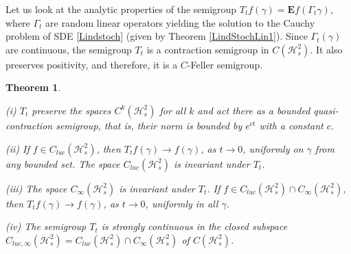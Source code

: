 \documentclass[10pt,a4paper]{amsart}
\def\HC{\mathcal{H}}
\def\E{\mathbf{E}}
\def\ga{\gamma}
\newtheorem{theorem}{Theorem}[section]
\newcommand{\Ga}{\Gamma}
\begin{document}
Let us look at the analytic properties of the semigroup $T_tf(\ga)=\E f(\Ga_t \ga)$,
where $\Ga_t$ are random linear operators yielding the solution
to the Cauchy problem of SDE \eqref{Lindstoch} (given by Theorem \ref{LindStochLin1}).
Since $\Ga_t(\ga)$ are continuous, the semigroup $T_t$ is a contraction semigroup in $C(\HC^2_s)$.
It also preserves positivity, and therefore, it is a $C$-Feller semigroup.

\begin{theorem}
\label{Linsdesem}

(i) $T_t$ preserve the spaces $C^k(\HC^2_s)$ for all $k$ and act there as a bounded quasi-contraction semigroup,
that is, their norm is bounded by $e^{ct}$ with a constant $c$.

(ii) If $f\in C_{luc}(\HC^2_s)$, then $T_tf(\ga) \to f(\ga)$, as $t\to 0$,
uniformly on $\ga$ from any bounded set. The space $C_{luc}(\HC^2_s)$ is invariant under $T_t$.

(iii) The space $C_{\infty}(\HC^2_s)$ is invariant under $T_t$.
If $f\in C_{luc}(\HC^2_s)\cap C_{\infty}(\HC^2_s)$,
then $T_tf(\ga) \to f(\ga)$, as $t\to 0$, uniformly in all $\ga$.

(iv) The semigroup $T_t$ is strongly continuous in the closed subspace
$C_{luc, \infty}(\HC^2_s)= C_{luc}(\HC^2_s)\cap C_{\infty}(\HC^2_s)$
of $C(\HC^2_s)$.
\end{theorem}
\end{document}
